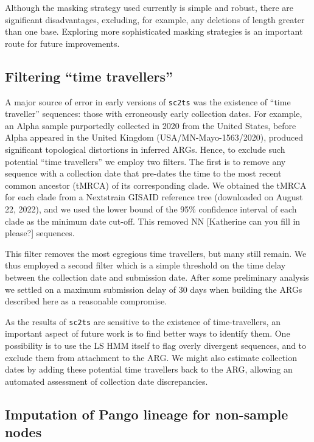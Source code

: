 \documentclass{article}
\begin{document}
Although the masking strategy used currently is simple and robust,
there are significant disadvantages, excluding, for example, any
deletions of length greater than one base. Exploring more sophisticated
masking strategies is an important route for future improvements.

\subsection{Filtering ``time travellers''}
\label{sec:filtering_time_travellers}
A major source of error in early versions of \texttt{sc2ts} was
the existence of ``time traveller'' sequences: those with erroneously
early collection dates.
For example, an Alpha sample purportedly collected in 2020 from the United States,
before Alpha appeared in the United Kingdom (USA/MN-Mayo-1563/2020),
produced significant topological distortions in
inferred ARGs.
Hence, to exclude such potential ``time travellers'' we employ two filters.
The first is to remove any sequence with a collection date that pre-dates the
time to the most recent common ancestor (tMRCA) of its corresponding clade.
We obtained the tMRCA for each clade from a Nextstrain GISAID reference tree
(downloaded on August 22, 2022), and we used the lower bound of the 95\%
confidence interval of each clade as the minimum date cut-off.
This removed NN [Katherine can you fill in please?] sequences.

This filter removes the most egregious time travellers, but many still
remain. We thus employed a second filter which is a simple threshold on
the time delay between the collection date and submission date.
After some preliminary analysis we settled on a maximum submission delay
of 30 days when building the ARGs described here as a reasonable compromise.

As the results of \texttt{sc2ts} are sensitive to the existence of
time-travellers, an important aspect of future work is to find better ways
to identify them. One possibility is to use the LS HMM itself to flag
overly divergent sequences, and to exclude them from attachment to the ARG.
We might also estimate collection dates by adding these potential time travellers
back to the ARG, allowing an automated assessment of collection date discrepancies.

\subsection{Imputation of Pango lineage for non-sample nodes}
\end{document}
